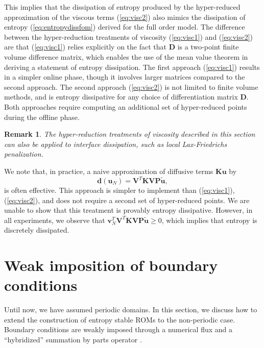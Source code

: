 \documentclass[review]{siamart171218}
\newtheorem*{remark}{Remark}
\theoremstyle{assumption}
\renewcommand{\tilde}{\widetilde}
\begin{document}
This implies that the dissipation of entropy produced by the hyper-reduced approximation of the viscous terms (\ref{eq:visc2}) also mimics the dissipation of entropy (\ref{eq:entropydissfom}) derived for the full order model.
The difference between the hyper-reduction treatments of viscosity (\ref{eq:visc1}) and (\ref{eq:visc2}) are that (\ref{eq:visc1}) relies explicitly on the fact that $\bm{D}$ is a two-point finite volume difference matrix, which enables the use of the mean value theorem in deriving a statement of entropy dissipation.   The first approach (\ref{eq:visc1}) results in a simpler online phase, though it involves larger matrices compared to the second approach.  The second approach (\ref{eq:visc2}) is not limited to finite volume methods, and is entropy dissipative for any choice of differentiation matrix $\bm{D}$.  Both approaches require computing an additional set of hyper-reduced points during the offline phase.  

\begin{remark}
The hyper-reduction treatments of viscosity described in this section can also be applied to interface dissipation, such as local Lax-Friedrichs penalization.  %
\end{remark}

We note that, in practice, a naive approximation of diffusive terms $\bm{K}\bm{u}$ by
\begin{equation}
\bm{d}(\bm{u}_N) = \bm{V}^T\bm{K}\bm{V}\bm{P}\tilde{\bm{u}},
\label{eq:visc3}
\end{equation}
is often effective.  This approach is simpler to implement than (\ref{eq:visc1}),(\ref{eq:visc2}), and does not require a second set of hyper-reduced points.  We are unable to show that this treatment is provably entropy dissipative.  However, in all experiments, we observe that $\bm{v}_N^T\bm{V}^T\bm{K}\bm{V}\bm{P}\tilde{\bm{u}} \geq 0$, which implies that entropy is discretely dissipated.  

\section{Weak imposition of boundary conditions}
\label{sec:6}
Until now, we have assumed periodic domains.  In this section, we discuss how to extend the construction of entropy stable ROMs to the non-periodic case.  Boundary conditions are weakly imposed through a numerical flux and a ``hybridized'' summation by parts operator \cite{chan2017discretely}.  
\end{document}
